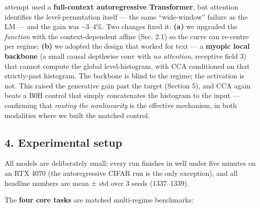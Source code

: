\documentclass[
  11pt,
]{article}
\begin{document}
\begin{enumerate}
  attempt used a \textbf{full-context autoregressive Transformer}, but
  attention identifies the level-permutation itself --- the same
  ``wide-window'' failure as the LM --- and the gain was
  \textasciitilde3--4\%. Two changes fixed it: \textbf{(a)} we upgraded
  the \emph{function} with the context-dependent affine (Sec. 2.1) so
  the curve can re-centre per regime; \textbf{(b)} we adopted the design
  that worked for text --- a \textbf{myopic local backbone} (a small
  causal depthwise conv with \emph{no attention}, receptive field 3)
  that cannot compute the global level-histogram, with CCA conditioned
  on that strictly-past histogram. The backbone is blind to the regime;
  the activation is not. This raised the generative gain past the target
  (Section 5), and CCA again beats a B0H control that simply
  concatenates the histogram to the input --- confirming that
  \emph{routing the nonlinearity} is the effective mechanism, in both
  modalities where we built the matched control.
\end{enumerate}

\subsection{4. Experimental setup}\label{experimental-setup}

All models are deliberately small; every run finishes in well under five
minutes on an RTX 4070 (the autoregressive CIFAR run is the only
exception), and all headline numbers are mean ± std over 3 seeds
(1337--1339).

The \textbf{four core tasks} are matched multi-regime benchmarks:
\end{document}
